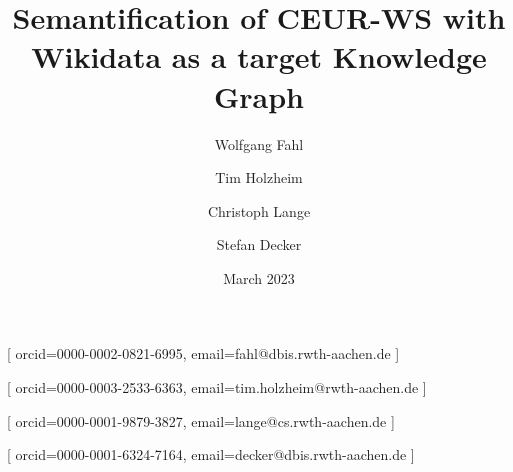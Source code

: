 \documentclass[]{ceurart}
\newcommand\simplehide[1]{#1}
\newcommand{\simplehide}[1]{#1}
\begin{document}
\title{Semantification of CEUR-WS with Wikidata as a target Knowledge Graph}
\author[1]{\simplehide{Wolfgang Fahl}}[
    orcid=0000-0002-0821-6995,
    email=fahl@dbis.rwth-aachen.de
]
\author[1]{\simplehide{Tim Holzheim}}[
    orcid=0000-0003-2533-6363,
    email=tim.holzheim@rwth-aachen.de
]
\author[1,2]{\simplehide{Christoph Lange}}[
    orcid=0000-0001-9879-3827,
    email=lange@cs.rwth-aachen.de
]
\author[1,2]{\simplehide{Stefan Decker}}[
    orcid=0000-0001-6324-7164,
    email=decker@dbis.rwth-aachen.de
]
\address[1]{\simplehide{RWTH Aachen University, Computer Science i5, Aachen, Germany}}
\address[2]{\simplehide{Fraunhofer FIT, Sankt Augustin, Germany}}

\date{March 2023}
\end{document}
